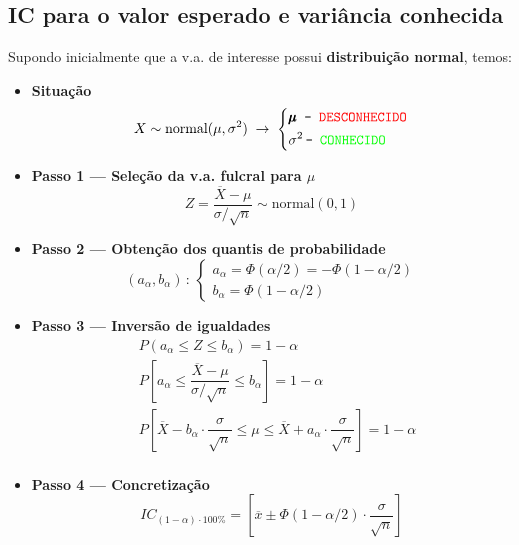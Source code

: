 \subsection[5.1 IC para o valor esperado e variância conhecida]{\hspace*{0.075 em}\raisebox{0.2 em}{$\pmb{\drsh}$} IC para o valor esperado e variância conhecida}

\noindent Supondo inicialmente que a v.a. de interesse possui \textbf{distribuição normal}, temos:

\begin{mdframed}
    \begin{itemize}[leftmargin=*]
        \item \textbf{Situação}
        $$
            X \sim \text{normal}(\mu, \sigma^2) \;\rightarrow\; \left\{
            \begin{aligned}
                &\pmb{\mu} \mkern9.5mu\texttt{-}\mkern9.5mu \texttt{\color{red} DESCONHECIDO} \\
                &\sigma^2 \mkern3mu\texttt{-}\mkern9mu \texttt{\color{green} CONHECIDO}
            \end{aligned}\right.
        $$
        
        \item \textbf{Passo 1 --- Seleção da v.a. fulcral para $\mu$}
        $$
            Z = \dfrac{\overline{X} - \mu}{\sigma/\sqrt{n}} \sim \text{normal}(0,1)
        $$
    
        \item \textbf{Passo 2 --- Obtenção dos quantis de probabilidade}
        $$
            (a_\alpha, b_\alpha)\, :\, \left\{\begin{array}{ll}
                 a_\alpha = \Phi(\alpha/2) = -\Phi(1 - \alpha/2)\\
                 b_\alpha = \Phi(1 - \alpha/2)
            \end{array}\right.
        $$
    
        \item \textbf{Passo 3 --- Inversão de igualdades}
        $$
            \begin{aligned}
                &P(a_\alpha \leq Z \leq b_\alpha) = 1 - \alpha\\
                &P\left[a_\alpha \leq \dfrac{\overline{X} - \mu}{\sigma/\sqrt{n}} \leq b_\alpha\right] = 1 - \alpha\\
                &P\left[\overline{X} - b_\alpha\cdot \dfrac{\sigma}{\sqrt{n}} \leq \mu \leq \overline{X} + a_\alpha\cdot \dfrac{\sigma}{\sqrt{n}}\right] = 1 - \alpha\\
            \end{aligned}
        $$
    
        \item\textbf{Passo 4 --- Concretização}
        $$
            IC_{(1 - \alpha)\cdot 100\%} = \left[\overline{x} \pm \Phi(1 - \alpha/2) \cdot \dfrac{\sigma}{\sqrt{n}}\right]
        $$
    \end{itemize}
\end{mdframed}

